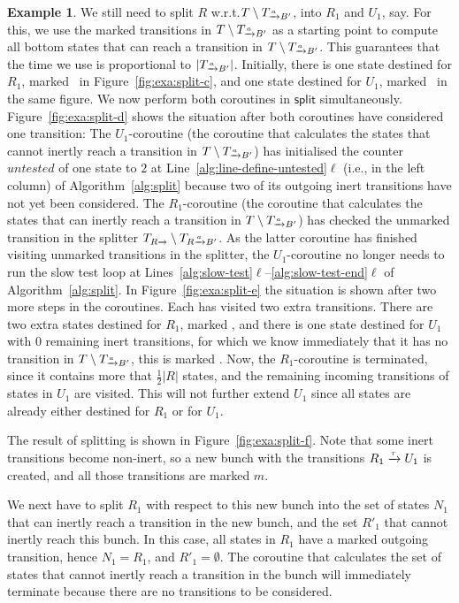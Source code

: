 \documentclass[a4paper,10pt]{article}
\theoremstyle{definition}
\newtheorem{example}[definition]{Example}
\theoremstyle{plain}
\newcommand{\pijl}[1]{\mathrel{\text{$\xrightarrow{\smash[t]{#1}}$}}}
\newcommand{\size}[1]{\left\lvert #1 \right\rvert}
\newcommand{\TaB}{T_{\pijl{a} B'}}
\newlength{\statetextwidth}\settowidth{\statetextwidth}{$s_0$}
\newcommand{\redstatetext}{\smash{\tikz[baseline=-0.37\statetextwidth]{\node[red state,thin,inner sep=0pt]{\makebox[0.5\statetextwidth]{}};}}}
\newcommand{\bluestatetext}{\smash{\tikz[baseline=-0.37\statetextwidth]{\node[blue state,thin,inner sep=0pt]{\makebox[0.5\statetextwidth]{}};}}}
\begin{document}
\begin{example}
We still need to split $R$ w.r.t.\@ $T \setminus \TaB$, into $R_1$ and $U_1$, say.
For this, we use the marked transitions in $T \setminus \TaB$ as a starting point to compute all bottom states that can reach a transition in $T \setminus \TaB$.
This guarantees that the time we use is proportional to $\size{\TaB}$.
Initially, there is one state destined for $R_1$, marked \redstatetext\ in Figure~\ref{fig:exa:split-c}, and one state destined for $U_1$, marked \bluestatetext\ in the same figure.
We now perform both coroutines in $\mathsf{split}$ simultaneously.
Figure~\ref{fig:exa:split-d} shows the situation after both coroutines have considered one transition:
The $U_1$-coroutine (the coroutine that calculates the states that cannot inertly reach a transition in $T \setminus \TaB$) has initialised the counter $\mathit{untested}$ of one state to $2$ at Line~\ref{alg:line-define-untested}$\ell$ (i.e., in the left column) of Algorithm~\ref{alg:split}
because two of its outgoing inert transitions have not yet been considered.
The $R_1$-coroutine (the coroutine that calculates the states that can inertly reach a transition in $T \setminus \TaB$) has checked the unmarked transition in the splitter $T_{R\pijl{}} \setminus T_{R \pijl{a} B'}$.
As the latter coroutine has finished visiting unmarked transitions in the splitter,
the $U_1$-coroutine no longer needs to run the slow test loop at Lines~\ref{alg:slow-test}$\ell$--\ref{alg:slow-test-end}$\ell$ of Algorithm~\ref{alg:split}.
In Figure~\ref{fig:exa:split-e} the situation is shown after two more steps in the coroutines.
Each has visited two extra transitions.
There are two extra states destined for $R_1$, marked \redstatetext,
and there is one state destined for $U_1$ with $0$ remaining inert transitions,
for which we know immediately that it has no transition in $T \setminus \TaB$, this is marked \bluestatetext.
Now, the $R_1$-coroutine is terminated, since it contains more that $\frac{1}{2}\size{R}$ states,
and the remaining incoming transitions of states in $U_1$ are visited.
This will not further extend $U_1$ since all states are already either destined for $R_1$ or for $U_1$.

The result of splitting is shown in Figure~\ref{fig:exa:split-f}.
Note that some inert transitions become non-inert,
so a new bunch with the transitions $R_1 \pijl{\tau} U_1$ is created,
and all those transitions are marked {\color{red}$m$}.

We next have to split $R_1$ with respect to this new bunch into the set of states $N_1$ that can inertly reach a transition in the new bunch, and the set $R'_1$ that cannot inertly reach this bunch.
In this case, all states in $R_1$ have a marked outgoing transition, hence $N_1 = R_1$, and $R'_1 = \emptyset$.
The coroutine that calculates the set of states that cannot inertly reach a transition in the bunch will immediately terminate because there are no transitions to be considered.


\end{example}
\end{document}
